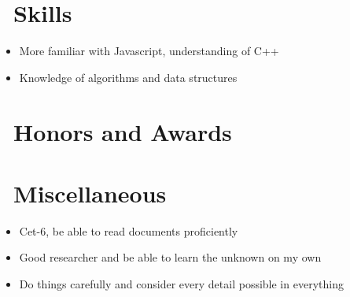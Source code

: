 \documentclass{resume}
\begin{document}
\section{\faCogs\ Skills}
\begin{itemize}[parsep=0.5ex]
  \item More familiar with Javascript, understanding of C++
  \item Knowledge of algorithms and data structures
\end{itemize}

\section{\faHeartO\ Honors and Awards}

\section{\faInfo\ Miscellaneous}
\begin{itemize}[parsep=0.5ex]
  \item Cet-6, be able to read documents proficiently
  \item Good researcher and be able to learn the unknown on my own
  \item Do things carefully and consider every detail possible in everything
\end{itemize}

%
%
\end{document}

